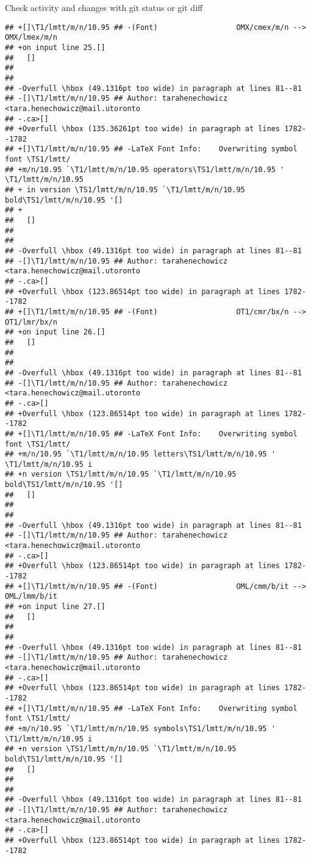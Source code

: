 \documentclass[ignorenonframetext,]{beamer}
\begin{document}
\begin{frame}[fragile]{Check activity and changes with git status or git
diff}
\begin{verbatim}
## +[]\T1/lmtt/m/n/10.95 ## -(Font)                  OMX/cmex/m/n --> OMX/lmex/m/n 
## +on input line 25.[] 
##   []
##  
##  
## -Overfull \hbox (49.1316pt too wide) in paragraph at lines 81--81
## -[]\T1/lmtt/m/n/10.95 ## Author: tarahenechowicz <tara.henechowicz@mail.utoronto
## -.ca>[] 
## +Overfull \hbox (135.36261pt too wide) in paragraph at lines 1782--1782
## +[]\T1/lmtt/m/n/10.95 ## -LaTeX Font Info:    Overwriting symbol font \TS1/lmtt/
## +m/n/10.95 `\T1/lmtt/m/n/10.95 operators\TS1/lmtt/m/n/10.95 ' \T1/lmtt/m/n/10.95
## + in version \TS1/lmtt/m/n/10.95 `\T1/lmtt/m/n/10.95 bold\TS1/lmtt/m/n/10.95 '[]
## + 
##   []
##  
##  
## -Overfull \hbox (49.1316pt too wide) in paragraph at lines 81--81
## -[]\T1/lmtt/m/n/10.95 ## Author: tarahenechowicz <tara.henechowicz@mail.utoronto
## -.ca>[] 
## +Overfull \hbox (123.86514pt too wide) in paragraph at lines 1782--1782
## +[]\T1/lmtt/m/n/10.95 ## -(Font)                  OT1/cmr/bx/n --> OT1/lmr/bx/n 
## +on input line 26.[] 
##   []
##  
##  
## -Overfull \hbox (49.1316pt too wide) in paragraph at lines 81--81
## -[]\T1/lmtt/m/n/10.95 ## Author: tarahenechowicz <tara.henechowicz@mail.utoronto
## -.ca>[] 
## +Overfull \hbox (123.86514pt too wide) in paragraph at lines 1782--1782
## +[]\T1/lmtt/m/n/10.95 ## -LaTeX Font Info:    Overwriting symbol font \TS1/lmtt/
## +m/n/10.95 `\T1/lmtt/m/n/10.95 letters\TS1/lmtt/m/n/10.95 ' \T1/lmtt/m/n/10.95 i
## +n version \TS1/lmtt/m/n/10.95 `\T1/lmtt/m/n/10.95 bold\TS1/lmtt/m/n/10.95 '[] 
##   []
##  
##  
## -Overfull \hbox (49.1316pt too wide) in paragraph at lines 81--81
## -[]\T1/lmtt/m/n/10.95 ## Author: tarahenechowicz <tara.henechowicz@mail.utoronto
## -.ca>[] 
## +Overfull \hbox (123.86514pt too wide) in paragraph at lines 1782--1782
## +[]\T1/lmtt/m/n/10.95 ## -(Font)                  OML/cmm/b/it --> OML/lmm/b/it 
## +on input line 27.[] 
##   []
##  
##  
## -Overfull \hbox (49.1316pt too wide) in paragraph at lines 81--81
## -[]\T1/lmtt/m/n/10.95 ## Author: tarahenechowicz <tara.henechowicz@mail.utoronto
## -.ca>[] 
## +Overfull \hbox (123.86514pt too wide) in paragraph at lines 1782--1782
## +[]\T1/lmtt/m/n/10.95 ## -LaTeX Font Info:    Overwriting symbol font \TS1/lmtt/
## +m/n/10.95 `\T1/lmtt/m/n/10.95 symbols\TS1/lmtt/m/n/10.95 ' \T1/lmtt/m/n/10.95 i
## +n version \TS1/lmtt/m/n/10.95 `\T1/lmtt/m/n/10.95 bold\TS1/lmtt/m/n/10.95 '[] 
##   []
##  
##  
## -Overfull \hbox (49.1316pt too wide) in paragraph at lines 81--81
## -[]\T1/lmtt/m/n/10.95 ## Author: tarahenechowicz <tara.henechowicz@mail.utoronto
## -.ca>[] 
## +Overfull \hbox (123.86514pt too wide) in paragraph at lines 1782--1782

\end{verbatim}
\end{frame}
\end{document}
